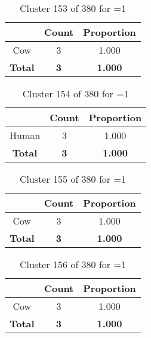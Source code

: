 \begin{table}[ht!]
\centering
\begin{tabular}{|c|c|c|}
\hline
\bf \Spec{} &\bf Count &\bf Proportion\\ \hline \hline
Cow & 3 & 1.000\\ \hline
\hline
\bf Total & \bf 3 & \bf 1.000\\ \hline
\end{tabular}
\label{tab:cluster:153:1}
\caption{Cluster 153 of 380 for \minneigh{}=1}
\end{table}

\begin{table}[ht!]
\centering
\begin{tabular}{|c|c|c|}
\hline
\bf \Spec{} &\bf Count &\bf Proportion\\ \hline \hline
Human & 3 & 1.000\\ \hline
\hline
\bf Total & \bf 3 & \bf 1.000\\ \hline
\end{tabular}
\label{tab:cluster:154:1}
\caption{Cluster 154 of 380 for \minneigh{}=1}
\end{table}

\begin{table}[ht!]
\centering
\begin{tabular}{|c|c|c|}
\hline
\bf \Spec{} &\bf Count &\bf Proportion\\ \hline \hline
Cow & 3 & 1.000\\ \hline
\hline
\bf Total & \bf 3 & \bf 1.000\\ \hline
\end{tabular}
\label{tab:cluster:155:1}
\caption{Cluster 155 of 380 for \minneigh{}=1}
\end{table}

\begin{table}[ht!]
\centering
\begin{tabular}{|c|c|c|}
\hline
\bf \Spec{} &\bf Count &\bf Proportion\\ \hline \hline
Cow & 3 & 1.000\\ \hline
\hline
\bf Total & \bf 3 & \bf 1.000\\ \hline
\end{tabular}
\label{tab:cluster:156:1}
\caption{Cluster 156 of 380 for \minneigh{}=1}
\end{table}

